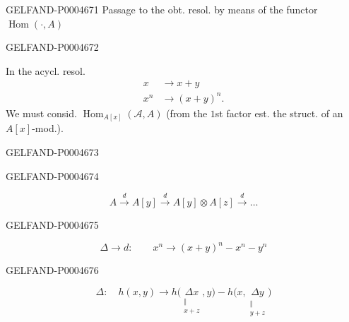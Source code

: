 \begin{GelfandAdjacentEvidence}{GELFAND-P000467}{1}
Passage to the obt. resol. by means of the functor $\operatorname{Hom}(\cdot,A)$
\end{GelfandAdjacentEvidence}
\begin{GelfandAdjacentEvidence}{GELFAND-P000467}{2}


In the acycl. resol.
\[
\begin{aligned}
x&\longrightarrow x+y\\
x^n&\longrightarrow(x+y)^n.
\end{aligned}
\]
We must consid. $\operatorname{Hom}_{A[x]}(\mathcal A,A)$
(from the $1$st factor est. the struct. of an $A[x]$-mod.).
\end{GelfandAdjacentEvidence}
\begin{GelfandAdjacentEvidence}{GELFAND-P000467}{3}

\end{GelfandAdjacentEvidence}
\begin{GelfandAdjacentEvidence}{GELFAND-P000467}{4}


\[
A\xrightarrow{d} A[y]\xrightarrow{d} A[y]\otimes A[z]\xrightarrow{d}\ldots
\]
\end{GelfandAdjacentEvidence}
\begin{GelfandAdjacentEvidence}{GELFAND-P000467}{5}

\[
\Delta\longrightarrow d:\qquad x^n\longrightarrow(x+y)^n-x^n-y^n
\]
\end{GelfandAdjacentEvidence}
\begin{GelfandAdjacentEvidence}{GELFAND-P000467}{6}

\[
\Delta:\quad h(x,y)\longrightarrow
h\bigl(\underset{\substack{\Vert\\x+z}}{\Delta x},y\bigr)
-
h\bigl(x,\underset{\substack{\Vert\\y+z}}{\Delta y}\bigr)
\]
\end{GelfandAdjacentEvidence}
